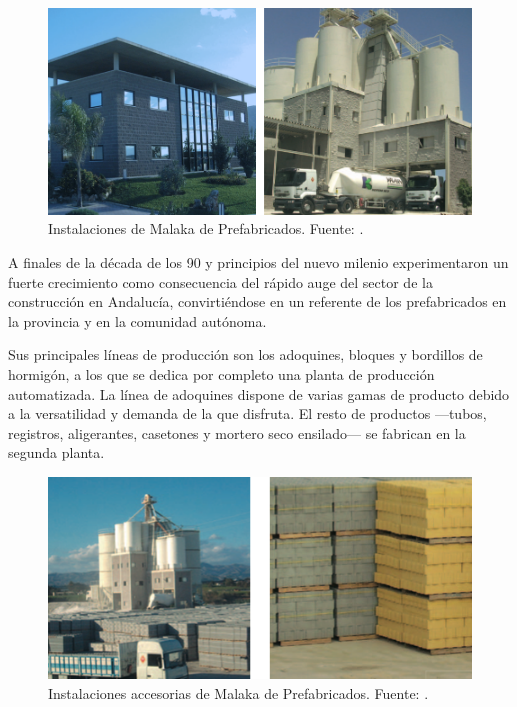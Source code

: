 \begin{figure}[!htb]
\centering
\includegraphics[width=15cm]{img/malaka1.png}
\caption[Instalaciones de Malaka de Prefabricados.]{Instalaciones de Malaka de Prefabricados. Fuente: \protect\cite{malakacatalogo}.}
\label{fig:malakainstalaciones1}
\end{figure}

A finales de la década de los 90 y principios del nuevo milenio experimentaron un fuerte crecimiento como consecuencia del rápido auge del sector de la construcción en Andalucía, convirtiéndose en un referente de los prefabricados en la provincia y en la comunidad autónoma.

Sus principales líneas de producción son los adoquines, bloques y bordillos de hormigón, a los que se dedica por completo una planta de producción automatizada. La línea de adoquines dispone de varias gamas de producto debido a la versatilidad y demanda de la que disfruta. El resto de productos —tubos, registros, aligerantes, casetones y mortero seco ensilado— se fabrican en la segunda planta.

\begin{figure}[!htb]
\centering
\includegraphics[width=15cm]{img/malaka2.png}
\caption[Instalaciones accesorias de Malaka de Prefabricados.]{Instalaciones accesorias de Malaka de Prefabricados. Fuente: \protect\cite{malakacatalogo}.}
\label{fig:malakainstalaciones2}
\end{figure}

